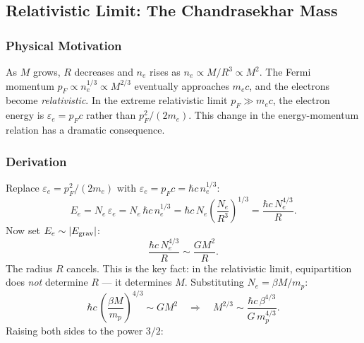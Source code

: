 \subsection{Relativistic Limit: The Chandrasekhar Mass}
\label{sec:lec10:chandrasekhar}

\subsubsection*{Physical Motivation}
As $M$ grows, $R$ decreases and $n_e$ rises as $n_e \propto M/R^3 \propto
M^2$. The Fermi momentum $p_F \propto n_e^{1/3} \propto M^{2/3}$ eventually
approaches $m_e c$, and the electrons become \emph{relativistic}. In the
extreme relativistic limit $p_F \gg m_e c$, the electron energy is $\varepsilon_e
= p_F c$ rather than $p_F^2/(2m_e)$. This change in the energy-momentum
relation has a dramatic consequence.

\subsubsection*{Derivation}

Replace $\varepsilon_e = p_F^2/(2m_e)$ with $\varepsilon_e = p_F c = \hbar c\,n_e^{1/3}$:
\begin{equation}
    E_e = N_e\,\varepsilon_e
    = N_e\,\hbar c\,n_e^{1/3}
    = \hbar c\,N_e \left(\frac{N_e}{R^3}\right)^{1/3}
    = \frac{\hbar c\,N_e^{4/3}}{R}.
    \label{eq:lec10:Ee-rel}
\end{equation}
Now set $E_e \sim |E_{\rm grav}|$:
\begin{equation}
    \frac{\hbar c\,N_e^{4/3}}{R} \sim \frac{GM^2}{R}.
    \label{eq:lec10:equip-rel}
\end{equation}
The radius $R$ cancels. This is the key fact: in the relativistic limit,
equipartition does \emph{not} determine $R$ --- it determines $M$. Substituting
$N_e = \beta M/m_p$:
\begin{equation}
    \hbar c\,\left(\frac{\beta M}{m_p}\right)^{4/3} \sim G M^2
    \quad\Longrightarrow\quad
    M^{2/3} \sim \frac{\hbar c\,\beta^{4/3}}{G\,m_p^{4/3}}.
    \label{eq:lec10:Mch-step}
\end{equation}
Raising both sides to the power $3/2$:


